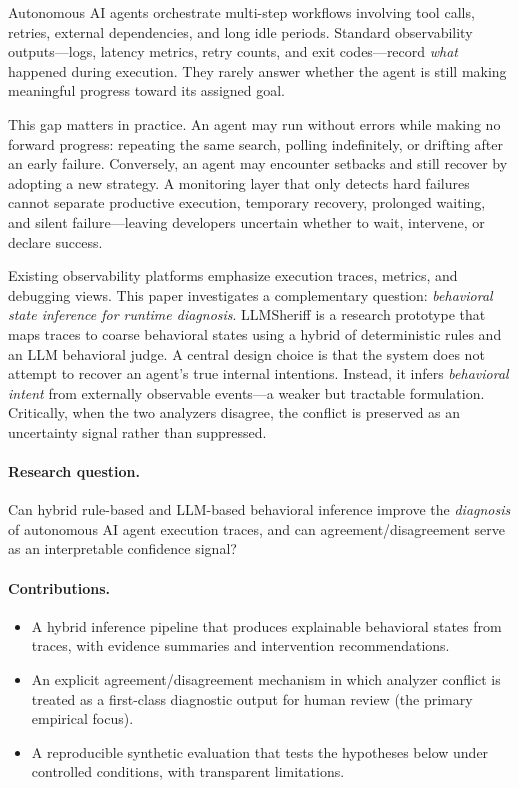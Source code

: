 \documentclass[conference]{IEEEtran}
\begin{document}
Autonomous AI agents orchestrate multi-step workflows involving tool calls, retries,
external dependencies, and long idle periods. Standard observability outputs---logs,
latency metrics, retry counts, and exit codes---record \emph{what} happened during
execution. They rarely answer whether the agent is still making meaningful progress toward
its assigned goal.

This gap matters in practice. An agent may run without errors while making no forward
progress: repeating the same search, polling indefinitely, or drifting after an early
failure. Conversely, an agent may encounter setbacks and still recover by adopting a new
strategy. A monitoring layer that only detects hard failures cannot separate productive
execution, temporary recovery, prolonged waiting, and silent failure---leaving developers
uncertain whether to wait, intervene, or declare success.

Existing observability platforms emphasize execution traces, metrics, and debugging views.
This paper investigates a complementary question: \emph{behavioral state inference for
runtime diagnosis}. LLMSheriff is a research prototype that maps traces to coarse
behavioral states using a hybrid of deterministic rules and an LLM behavioral judge. A
central design choice is that the system does not attempt to recover an agent's true
internal intentions. Instead, it infers \emph{behavioral intent} from externally
observable events---a weaker but tractable formulation. Critically, when the two analyzers
disagree, the conflict is preserved as an uncertainty signal rather than suppressed.

\paragraph{Research question.}
Can hybrid rule-based and LLM-based behavioral inference improve the
\emph{diagnosis} of autonomous AI agent execution traces, and can
agreement/disagreement serve as an interpretable confidence signal?

\paragraph{Contributions.}
\begin{itemize}
\item A hybrid inference pipeline that produces explainable behavioral states from traces,
with evidence summaries and intervention recommendations.
\item An explicit agreement/disagreement mechanism in which analyzer conflict is treated as
a first-class diagnostic output for human review (the primary empirical focus).
\item A reproducible synthetic evaluation that tests the hypotheses below under controlled
conditions, with transparent limitations.
\end{itemize}
\end{document}
